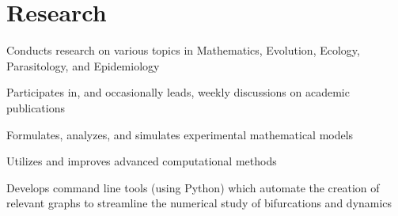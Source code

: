 \documentclass[letterpaper]{deedy-resume} %
\begin{document}
\begin{minipage}[t]{0.66\textwidth}






\vspace{15pt}

\section{Research}


\begin{tightitemize}
\item Conducts research on various topics in Mathematics, Evolution, Ecology, Parasitology, and Epidemiology
\item Participates in, and occasionally leads, weekly discussions on academic publications
\item Formulates, analyzes, and simulates experimental mathematical models
\item Utilizes and improves advanced computational methods
\item Develops command line tools (using Python) which automate the creation of relevant graphs to streamline the numerical study of bifurcations and dynamics
\end{tightitemize}


\end{minipage}
\end{document}
